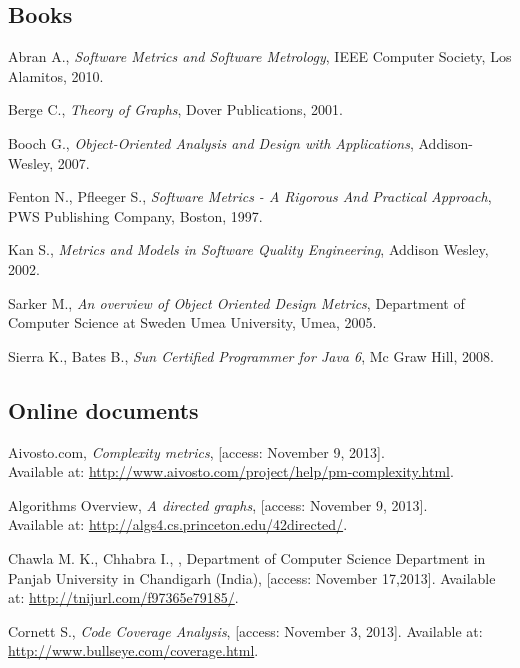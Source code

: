 \begin{thebibliography}{100}

\subsection*{Books}

	 Abran A., {\em Software Metrics and Software Metrology}, IEEE Computer Society, Los Alamitos, 2010.	
	
	 Berge C., {\em Theory of Graphs}, Dover Publications, 2001. 
	
	 Booch G., {\em Object-Oriented Analysis and Design with Applications}, Addison-Wesley, 2007.
	
	 Fenton N., Pfleeger S., {\em Software Metrics - A Rigorous And Practical Approach}, PWS Publishing Company, Boston, 1997.
	
	 Kan S., {\em Metrics and Models in Software Quality Engineering}, Addison Wesley, 2002.

	 Sarker M., {\em An overview of Object Oriented Design Metrics}, Department of Computer Science at Sweden Umea University, Umea, 2005.
		
	 Sierra K., Bates B., {\em Sun Certified Programmer for Java 6}, Mc Graw Hill, 2008.
	
\subsection*{Online documents}

	 Aivosto.com, {\em Complexity metrics}, [access: November 9, 2013]. \\ Available at: \url{http://www.aivosto.com/project/help/pm-complexity.html}. 
	
	 Algorithms Overview, {\em A directed graphs}, [access: November 9, 2013].\\  Available at: \url{http://algs4.cs.princeton.edu/42directed/}.

 Chawla M. K., Chhabra I., {\em }, Department of Computer Science Department in Panjab University in Chandigarh (India), [access: November 17,2013]. Available at: \url{http://tnijurl.com/f97365e79185/}.

	 Cornett S., {\em Code Coverage Analysis}, [access: November 3, 2013]. Available at: \url{http://www.bullseye.com/coverage.html}.


\end{thebibliography}
